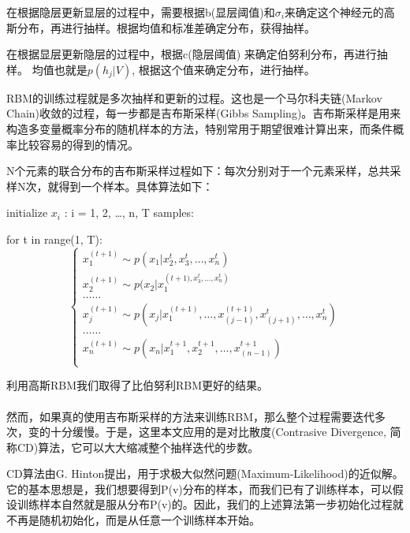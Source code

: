 	在根据隐层更新显层的过程中，需要根据b(显层阈值)和$\sigma_i$来确定这个神经元的高斯分布，再进行抽样。根据均值和标准差确定分布，获得抽样。
	
	在根据显层更新隐层的过程中，根据c(隐层阈值) 来确定伯努利分布，再进行抽样。 均值也就是$p(h_j| V)$, 根据这个值来确定分布，进行抽样。
	
	RBM的训练过程就是多次抽样和更新的过程。这也是一个马尔科夫链(Markov Chain)收敛的过程，每一步都是吉布斯采样(Gibbs Sampling)。吉布斯采样是用来构造多变量概率分布的随机样本的方法，特别常用于期望很难计算出来，而条件概率比较容易的得到的情况。
	
	N个元素的联合分布的吉布斯采样过程如下：每次分别对于一个元素采样，总共采样N次，就得到一个样本。具体算法如下：
	
	initialize $x_i$ : i = 1, 2, …, n, T samples:
	
	for t in range(1, T):\\

	\begin{equation}
	\begin{cases}
		x_1^{(t+1)} \sim p(x_1 | x_2^t, x_3^t,…, x_n^t)\\
		x_2^{(t+1)} \sim p(x_2 | x_1^({t+1)}, x_3^t,…, x_n^t)\\
		……\\
		x_j^{(t+1)} \sim p(x_j | x_1^{(t+1)},…,x_{(j-1)}^{(t+1)},x_{(j+1)}^t,…, x_n^t)\\
		……\\
		x_n^{(t+1)} \sim p(x_n | x_1^{t+1}, x_2^{t+1},…, x_{(n-1)}^{t+1})\\
	\end{cases}
	\end{equation}
	
	利用高斯RBM我们取得了比伯努利RBM更好的结果。
	\\
	\\
	然而，如果真的使用吉布斯采样的方法来训练RBM，那么整个过程需要迭代多次，变的十分缓慢。于是，这里本文应用的是对比散度(Contrasive Divergence, 简称CD)算法，它可以大大缩减整个抽样迭代的步数。
	
	CD算法由G. Hinton提出，用于求极大似然问题(Maximum-Likelihood)的近似解。它的基本思想是，我们想要得到P(v)分布的样本，而我们已有了训练样本，可以假设训练样本自然就是服从分布P(v)的。因此，我们的上述算法第一步初始化过程就不再是随机初始化，而是从任意一个训练样本开始。
	
